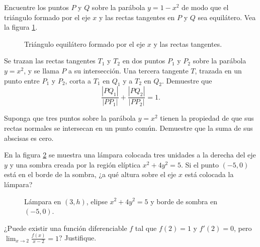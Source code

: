 \begin{prob}
Encuentre los puntos $P$ y $Q$ sobre la parábola $y=1-x^2$ de modo que
el triángulo formado por el eje $x$ y las rectas tangentes en $P$ y $Q$
sea equilátero. Vea la figura \ref{trider}.
\begin{figure}[!htbp]
\centering

\caption{Triángulo equilátero formado por el eje $x$ y las rectas tangentes.}
\label{trider}
\end{figure}
\end{prob}

\begin{prob}
Se trazan las rectas tangentes $T_1$ y $T_2$ en dos puntos $P_1$ y $P_2$
sobre la parábola $y=x^2$, y se llama $P$ a su intersección. Una tercera
tangente $T$, trazada en un punto entre $P_1$ y $P_2$, corta a $T_1$ en
$Q_1$ y a $T_2$ en $Q_2$. Demuestre que
\[
\frac{|PQ_1|}{|PP_1|}+\frac{|PQ_2|}{|PP_2|}=1.
\]
\end{prob}

\begin{prob}
Suponga que tres puntos sobre la parábola $y=x^2$ tienen la propiedad
de que sus rectas normales se intersecan en un punto común. Demuestre
que la suma de sus abscisas es cero.
\end{prob}

\begin{prob}
En la figura \ref{lamparader} se muestra una lámpara colocada tres unidades a la derecha
del eje $y$ y una sombra creada por la región elíptica $x^2+4y^2=5$.
Si el punto $(-5,0)$ está en el borde de la sombra, ¿a qué altura sobre
el eje $x$ está colocada la lámpara?

\begin{figure}[!htbp]
\centering
{}
\caption{Lámpara en $(3,h)$, elipse $x^2+4y^2=5$
y borde de sombra en $(-5,0)$.}
\label{lamparader}
\end{figure}

\end{prob}

\begin{prob}
¿Puede existir una función diferenciable $f$ tal que $f(2)=1$ y
$f'(2)=0$, pero $\displaystyle\lim_{x\to 2}\frac{f(x)}{x-2}=1$?
Justifique.
\end{prob}
